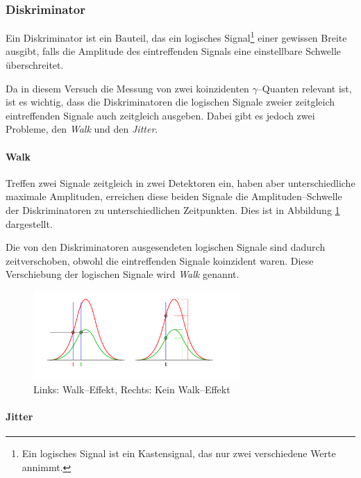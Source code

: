 \documentclass[12pt,a4paper]{scrartcl}
\numberwithin{equation}{section} %
\begin{document}
\hypertarget{diskriminator}{%
\subsubsection{Diskriminator}\label{diskriminator}}

Ein Diskriminator ist ein Bauteil, das ein logisches Signal\footnote{Ein logisches Signal ist ein Kastensignal, das nur zwei verschiedene Werte annimmt.} einer gewissen Breite ausgibt, falls die Amplitude des eintreffenden Signals eine einstellbare Schwelle überschreitet.

Da in diesem Versuch die Messung von zwei koinzidenten $\gamma$--Quanten relevant ist, ist es wichtig, dass die Diskriminatoren die logischen Signale zweier zeitgleich eintreffenden Signale auch zeitgleich ausgeben. Dabei gibt es jedoch zwei Probleme, den \emph{Walk} und den \emph{Jitter}.

\paragraph{Walk}
Treffen zwei Signale zeitgleich in zwei Detektoren ein, haben aber unterschiedliche maximale Amplituden, erreichen diese beiden Signale die Amplituden--Schwelle der Diskriminatoren zu unterschiedlichen Zeitpunkten. Dies ist in Abbildung \ref{abb:Walk-Effekt} dargestellt.

Die von den Diskriminatoren ausgesendeten logischen Signale sind dadurch zeitverschoben, obwohl die eintreffenden Signale koinzident waren. Diese Verschiebung der logischen Signale wird \emph{Walk} genannt.

\begin{figure}[h]
	\centering
	\includegraphics[width=0.7\textwidth]{../media/B3.4/Constant_fraction_1.pdf}
	\caption{Links: Walk--Effekt, Rechts: Kein Walk--Effekt}
	\label{abb:Walk-Effekt}
\end{figure}

\hypertarget{jitter}{%
\paragraph{Jitter}\label{jitter}}
\end{document}
